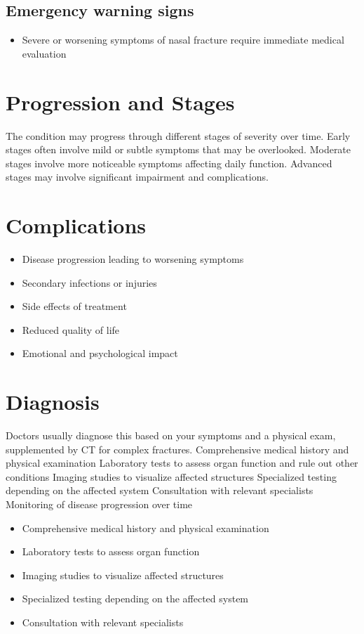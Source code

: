 \subsection{Emergency warning signs}
\begin{itemize}[noitemsep]
  \item Severe or worsening symptoms of nasal fracture require immediate medical evaluation
\end{itemize}
\section{Progression and Stages}
The condition may progress through different stages of severity over time. Early stages often involve mild or subtle symptoms that may be overlooked. Moderate stages involve more noticeable symptoms affecting daily function. Advanced stages may involve significant impairment and complications.
\section{Complications}
\begin{itemize}[noitemsep]
  \item Disease progression leading to worsening symptoms
  \item Secondary infections or injuries
  \item Side effects of treatment
  \item Reduced quality of life
  \item Emotional and psychological impact
\end{itemize}
\section{Diagnosis}
Doctors usually diagnose this based on your symptoms and a physical exam, supplemented by CT for complex fractures. Comprehensive medical history and physical examination Laboratory tests to assess organ function and rule out other conditions Imaging studies to visualize affected structures Specialized testing depending on the affected system Consultation with relevant specialists Monitoring of disease progression over time

\begin{itemize}[noitemsep]
  \item Comprehensive medical history and physical examination
  \item Laboratory tests to assess organ function
  \item Imaging studies to visualize affected structures
  \item Specialized testing depending on the affected system
  \item Consultation with relevant specialists
\end{itemize}
